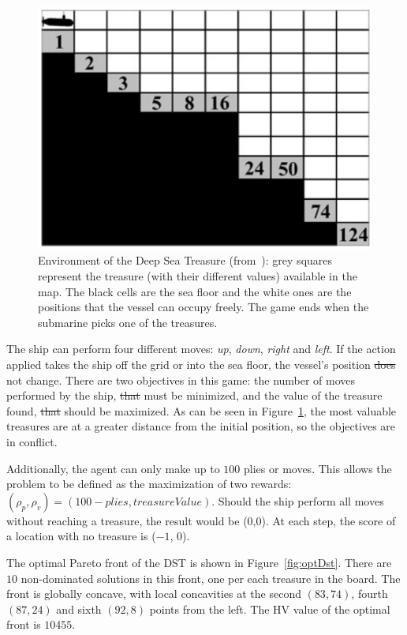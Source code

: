\documentclass[journal]{IEEEtran}
\providecommand{\DIFaddtex}[1]{{\protect\color{blue}\uwave{#1}}} %
\providecommand{\DIFdeltex}[1]{{\protect\color{red}\sout{#1}}}                      %
\providecommand{\DIFaddbegin}{} %
\providecommand{\DIFaddend}{} %
\providecommand{\DIFdelbegin}{} %
\providecommand{\DIFdelend}{} %
\providecommand{\DIFadd}[1]{\texorpdfstring{\DIFaddtex{#1}}{#1}} %
\providecommand{\DIFdel}[1]{\texorpdfstring{\DIFdeltex{#1}}{}} %
\begin{document}
\begin{figure}[!t]
\begin{center}
\includegraphics[width=0.75\columnwidth]{img/dst}
\end{center}
\caption{Environment of the Deep Sea Treasure (from~\cite{Vamplew2010}): grey squares represent the treasure (with their different values) available in the map. The black cells are the sea floor and the white ones are the positions that the vessel can occupy freely. The game ends when the submarine picks one of the treasures.}
\label{fig:dstBase}
\end{figure}


The ship can perform four different moves: \textit{up}, \textit{down}, \textit{right}  and \textit{left}. If the action applied takes the ship off the grid or into the sea floor, the vessel's position \DIFdelbegin \DIFdel{does }\DIFdelend \DIFaddbegin \DIFadd{will }\DIFaddend not change.  There are two objectives in this game: the number of moves performed by the ship, \DIFdelbegin \DIFdel{that }\DIFdelend \DIFaddbegin \DIFadd{which }\DIFaddend must be minimized, and the value of the treasure found, \DIFdelbegin \DIFdel{that }\DIFdelend \DIFaddbegin \DIFadd{which }\DIFaddend should be maximized. As can be seen in Figure~\ref{fig:dstBase}, the most valuable treasures are at a greater distance from the initial position, so the objectives are in conflict.

Additionally, the agent can only make up to $100$ plies or moves. This allows the problem to be defined as the maximization of two rewards: $(\rho_p,\rho_v) = (100 - plies, treasureValue)$. Should the ship perform all moves without reaching a treasure, the result would be ($0$,$0$). At each step, the score of a location with no treasure is ($-1$, $0$).

The optimal Pareto front of the DST is shown in Figure~\ref{fig:optDst}. There are $10$ non-dominated solutions in this front, one per each treasure in the board. The front is globally concave, with local concavities at the second $(83,74)$, fourth $(87,24)$ and sixth $(92,8)$ points from the left. The HV value of the optimal front is $10455$.
\end{document}

